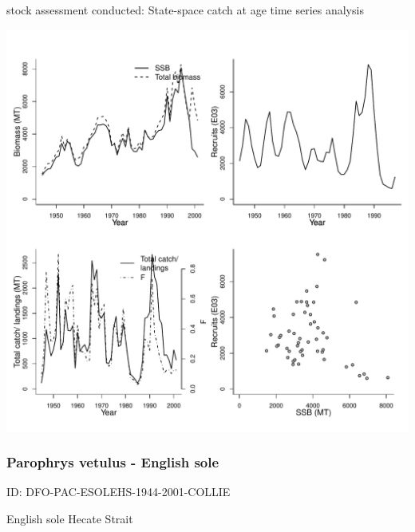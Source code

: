 stock assessment conducted: State-space catch at age time series analysis 
\begin{center}
\vspace{-0.2cm}\includegraphics[scale=0.65]{../tex/figures/plot-DFO-PAC-RSOLEHSTR-1945-2001-COLLIE.pdf}
\end{center}

\newpage
\subsubsection{Parophrys vetulus - English sole}
ID: DFO-PAC-ESOLEHS-1944-2001-COLLIE

English sole Hecate Strait 

